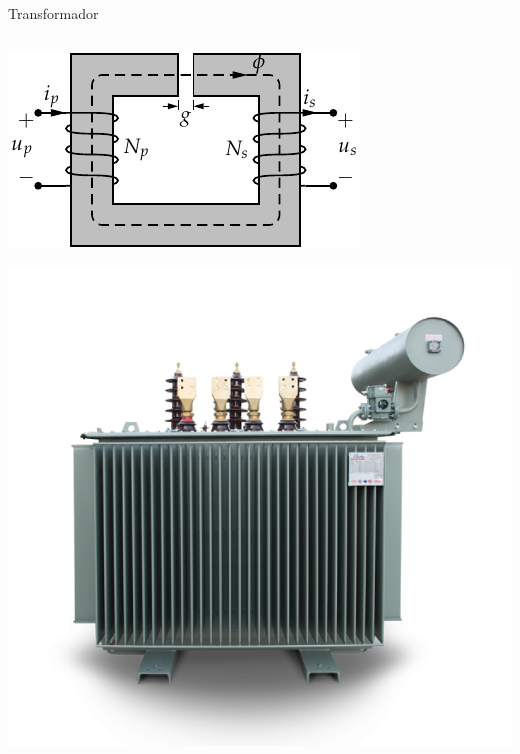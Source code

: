 \documentclass[xcolor={usenames,svgnames,dvipsnames}]{beamer}
\begin{document}
\begin{frame}[label={sec:orgdee8163}]{Transformador}
\begin{columns}
\begin{column}{0.4\columnwidth}
\begin{center}
\includegraphics[width=.9\linewidth]{../figs/Transformador2.pdf}
\end{center}
\begin{center}
\includegraphics[width=.9\linewidth]{../figs/Transformador.png}
\end{center}
\end{column}
\end{columns}
\end{frame}
\end{document}
